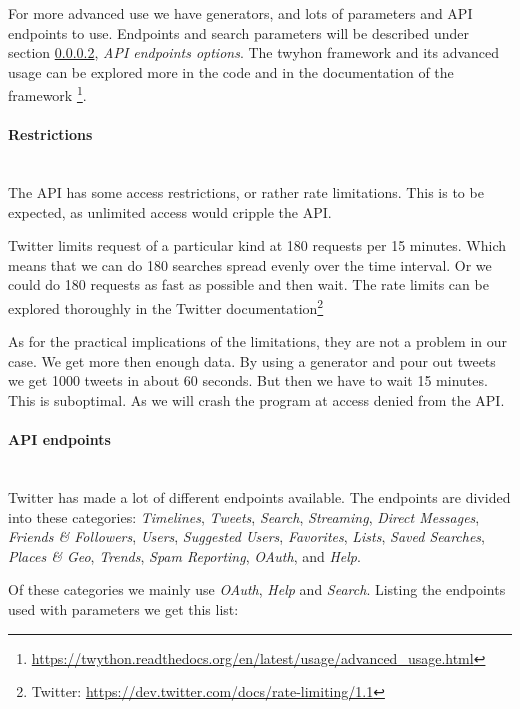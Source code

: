 For more advanced use we have generators, and lots of parameters and API
endpoints to use. Endpoints and search parameters will be described under
section \ref{data:twitter:endpoints}, \textit{API endpoints options}. 
The twyhon framework and its advanced usage can be explored more in the code and
in the documentation of the framework
\footnote{\url{https://twython.readthedocs.org/en/latest/usage/advanced_usage.html}}.
%

\paragraph{Restrictions}
\hspace{0pt}\\
The API has some access restrictions, or rather rate limitations. This is to be
expected, as unlimited access would cripple the API.

Twitter limits request of a particular kind at 180 requests per 15 minutes.
Which means that we can do 180 searches spread evenly over the time interval. Or
we could do 180 requests as fast as possible and then wait. The rate limits can
be explored thoroughly in the Twitter documentation\footnote{Twitter:
\url{https://dev.twitter.com/docs/rate-limiting/1.1}}

As for the practical implications  of the limitations, they are not a problem in
our case. We get more then enough data. By using a generator and pour out tweets
we get 1000 tweets in about 60 seconds. But then we have to wait 15 minutes.
This is suboptimal. As we will crash the program at access denied from the API.  
%

\paragraph{API endpoints}\label{data:twitter:endpoints}
\hspace{0pt}\\
Twitter has made a lot of different endpoints available. The endpoints are
divided into these categories: \textit{Timelines}, \textit{Tweets},
\textit{Search}, \textit{Streaming}, \textit{Direct Messages}, \textit{Friends
\& Followers}, \textit{Users}, \textit{Suggested Users}, \textit{Favorites},
\textit{Lists}, \textit{Saved Searches}, \textit{Places \& Geo},
\textit{Trends}, \textit{Spam Reporting}, \textit{OAuth}, and \textit{Help}.

Of these categories we mainly use \textit{OAuth}, \textit{Help} and
\textit{Search}.
Listing the endpoints used with parameters we get this list: 


